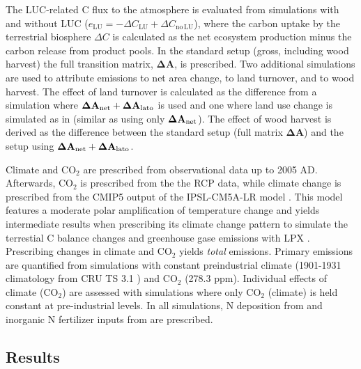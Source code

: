 The LUC-related C flux to the atmosphere is evaluated from simulations with and without LUC ($ e_{\mathrm{LU}} = - \Delta C_{\mathrm{LU}} + \Delta C_{\mathrm{no\,LU}} $), where the carbon uptake by the terrestrial biosphere $\Delta C$ is calculated as the net ecosystem production minus the carbon release from product pools. In the standard setup (gross, including wood harvest) the full transition matrix, $\mathbf{\Delta A}$, is prescribed. Two additional simulations are used to attribute emissions to net area change, to land turnover, and to wood harvest. The effect of land turnover is calculated as the difference from a simulation where $\mathbf{\Delta A}_{\mbox{\scriptsize net}}+\mathbf{\Delta A}_{\mbox{\scriptsize lato}}$ is used and one where land use change is simulated as in \citet{stocker11bg} (similar as using only $\mathbf{\Delta A}_{\mbox{\scriptsize net}}$). The effect of wood harvest is derived as the difference between the standard setup (full matrix $\mathbf{\Delta A}$) and the setup using $\mathbf{\Delta A}_{\mbox{\scriptsize net}}+\mathbf{\Delta A}_{\mbox{\scriptsize lato}}$.

Climate and CO$_2$ are prescribed from observational data up to 2005 AD. Afterwards, CO$_2$ is prescribed from the the RCP data, while climate change is prescribed from the CMIP5 output of the IPSL-CM5A-LR model \citep{dufresne13cd}. This model features a moderate polar amplification of temperature change and yields intermediate results when prescribing its climate change pattern to simulate the terrestial C balance changes and greenhouse gase emissions with LPX \citep{stocker13natcc}. Prescribing changes in climate and CO$_2$ yields {\it total} emissions. Primary emissions are quantified from simulations with constant preindustrial climate (1901-1931 climatology from CRU TS 3.1 \citep{mitchelljones05clim}) and CO$_2$ (278.3 ppm). Individual effects of climate (CO$_2$) are assessed with simulations where only CO$_2$ (climate) is held constant at pre-industrial levels. In all simulations, N deposition from \citet{lamarque11cc} and inorganic N fertilizer inputs from \citet{zaehle11ngeo, stocker13natcc} are prescribed.

\subsection*{Results}

